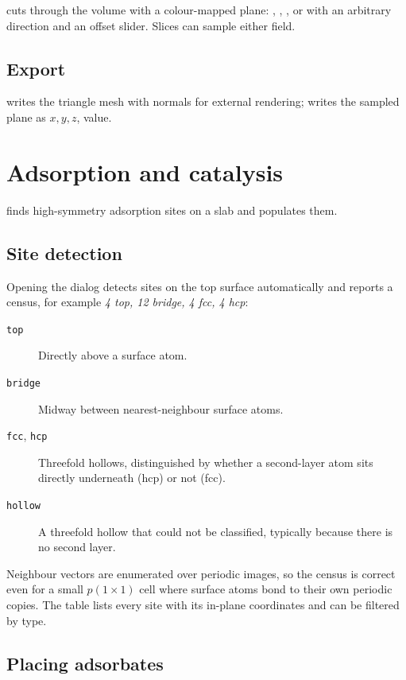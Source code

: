  cuts through the volume with a colour-mapped plane:
, , , or  with an arbitrary
direction and an offset slider. Slices can sample either field.

\subsection{Export}

 writes the triangle mesh with normals
for external rendering;  writes the sampled
plane as $x, y, z$, value.

\section{Adsorption and catalysis}
\label{sec:adsorption}

\menusep{} finds high-symmetry
adsorption sites on a slab and populates them.

\subsection{Site detection}

Opening the dialog detects sites on the top surface automatically and
reports a census, for example \emph{4 top, 12 bridge, 4 fcc, 4 hcp}:

\begin{description}
  \item[\texttt{top}] Directly above a surface atom.
  \item[\texttt{bridge}] Midway between nearest-neighbour surface atoms.
  \item[\texttt{fcc}, \texttt{hcp}] Threefold hollows, distinguished by
    whether a second-layer atom sits directly underneath (hcp) or not
    (fcc).
  \item[\texttt{hollow}] A threefold hollow that could not be classified,
    typically because there is no second layer.
\end{description}

Neighbour vectors are enumerated over periodic images, so the census is
correct even for a small $p(1\times1)$ cell where surface atoms bond to
their own periodic copies. The table lists every site with its in-plane
coordinates and can be filtered by type.

\subsection{Placing adsorbates}

